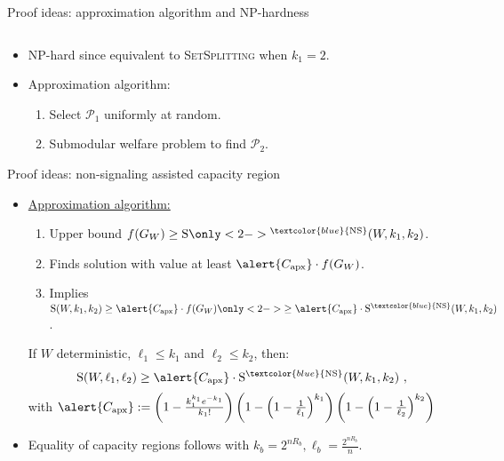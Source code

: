 \documentclass{beamer}
\theoremstyle{definition}
\theoremstyle{remark}
\begin{document}
\begin{frame}{Proof ideas: approximation algorithm and \textrm{NP}-hardness}
\begin{columns}
\begin{column}{4cm}
\begin{center}
      \end{center}
    \end{column}
  \end{columns}
  \pause\pause\pause\pause\bigskip
  \begin{itemize}
  \item \textrm{NP}-hard since equivalent to \textsc{SetSplitting} when $k_1=2$.
    \pause
    \bigskip
  \item Approximation algorithm:
    \begin{enumerate}
    \item Select $\mathcal{P}_1$ uniformly at random.
    \item Submodular welfare problem to find $\mathcal{P}_2$.
    \end{enumerate}
  \end{itemize}
\end{frame}

\begin{frame}{Proof ideas: non-signaling assisted capacity region}
  \begin{itemize}

  \item \underline{Approximation algorithm:}
    \begin{enumerate}
    \item Upper bound $f(G_W) \geq \mathrm{S}\only<2->{^{\textcolor{blue}{\mathrm{NS}}}}(W,k_1,k_2)$.
    \item Finds solution with value at least $\alert{C_{\text{apx}}} \cdot f(G_W)$.
    \item Implies $\mathrm{S}(W,k_1,k_2) \geq \alert{C_{\text{apx}}} \cdot f(G_W)\only<2->{ \geq \alert{C_{\text{apx}}} \cdot  \mathrm{S}^{\textcolor{blue}{\mathrm{NS}}}(W,k_1,k_2)}$.
    \end{enumerate}
    \pause
    \pause
    \begin{theorem}
      \label{theo:NSdet}
      If $W$ deterministic, $\ell_1 \leq k_1$ and $\ell_2 \leq k_2$, then:
      \[ \mathrm{S}(W,\ell_1,\ell_2) \geq \alert{C_{\text{apx}}} \cdot  \mathrm{S}^{\textcolor{blue}{\mathrm{NS}}}(W,k_1,k_2) \ , \]
        with $\alert{C_{\text{apx}}} := \left(1 - \frac{k_1^{k_1}e^{-k_1}}{k_1!}\right)\left(1-\left(1-\frac{1}{\ell_1}\right)^{k_1}\right)\left(1-\left(1-\frac{1}{\ell_2}\right)^{k_2}\right)$
    \end{theorem}
    \pause
    \bigskip
  \item Equality of capacity regions follows with $k_b=2^{nR_b},\ell_b=\frac{2^{nR_b}}{n}$.
  \end{itemize}
\end{frame}
\end{document}
